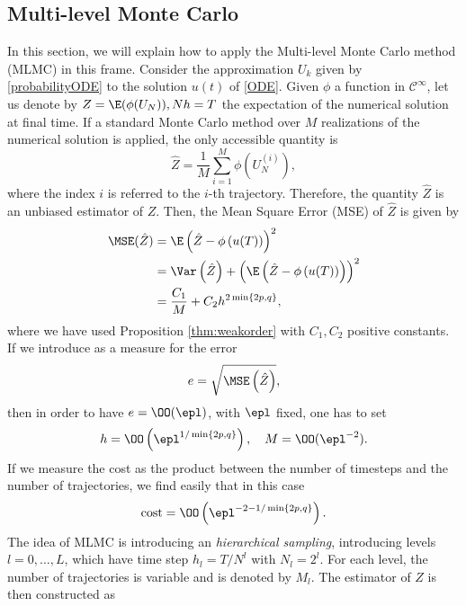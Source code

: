 \subsection{Multi-level Monte Carlo}

In this section, we will explain how to apply the Multi-level Monte Carlo method (MLMC) in this frame. Consider the approximation $U_k$ given by \eqref{probabilityODE} to the solution $u(t)$ of \eqref{ODE}. Given $\phi$ a function in $\mathcal C^\infty$, let us denote by $Z = \E(\phi(U_N)), Nh = T$ the expectation of the numerical solution at final time. If a standard Monte Carlo method over $M$ realizations of the numerical solution is applied, the only accessible quantity is
\begin{equation}\label{MonteCarlo}
	\hat Z = \frac{1}{M} \sum_{i = 1}^M \phi\left(U_N^{(i)}\right),
\end{equation}
where the index $i$ is referred to the $i$-th trajectory. Therefore, the quantity $\hat Z$ is an unbiased estimator of $Z$. Then, the Mean Square Error (MSE) of $\hat Z$ is given by
\begin{equation}\label{MSEMC}
\begin{aligned}
	\MSE(\hat Z) &= \E\left(\hat Z - \phi\left(u(T)\right)\right)^2 \\
	&= \Var\left(\hat Z\right) + \left(\E\left(\hat Z - \phi\left(u(T)\right)\right)\right)^2 \\
	&= \frac{C_1}{M} + C_2 h^{2\min\{2p, q\}},
\end{aligned}
\end{equation} 
where we have used Proposition \ref{thm:weakorder} with $C_1, C_2$ positive constants. If we introduce as a measure for the error 
\begin{equation}
	e = \sqrt{\MSE\left(\hat Z\right)},
\end{equation}
then in order to have $e = \OO(\epl)$, with $\epl$ fixed, one has to set
\begin{equation}
	h = \OO\left(\epl^{1 / \min\{2p, q\}} \right), \quad M = \OO(\epl^{-2}).
\end{equation}
If we measure the cost as the product between the number of timesteps and the number of trajectories, we find easily that in this case
\begin{equation}
	\mathrm{cost} = \OO\left(\epl^{-2 - 1/\min\{2p, q\}}\right).
\end{equation}
The idea of MLMC is introducing an \textit{hierarchical sampling}, introducing levels $l = 0, \ldots, L$, which have time step $h_l = T / N^l$ with $N_l = 2^l$. For each level, the number of trajectories is variable and is denoted by $M_l$. The estimator of $Z$ is then constructed as
